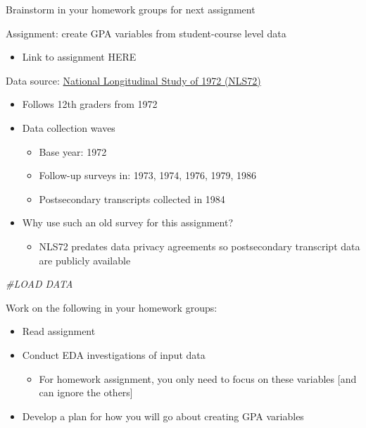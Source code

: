 \documentclass[8pt,ignorenonframetext,dvipsnames]{beamer}
\newenvironment{Shaded}{\begin{snugshade}}{\end{snugshade}}
\newcommand{\CommentTok}[1]{\textcolor[rgb]{0.56,0.35,0.01}{\textit{#1}}}
\providecommand{\tightlist}{%
  \setlength{\itemsep}{0pt}\setlength{\parskip}{0pt}}
\let\olditem\item
\renewcommand{\item}{%
  \olditem\vspace{4pt}
}
\begin{document}
\begin{frame}[fragile]{Brainstorm in your homework groups for next
assignment}

Assignment: create GPA variables from student-course level data

\begin{itemize}
\tightlist
\item
  Link to assignment HERE
\end{itemize}

Data source: \href{https://nces.ed.gov/surveys/nls72/}{National
Longitudinal Study of 1972 (NLS72)}

\begin{itemize}
\tightlist
\item
  Follows 12th graders from 1972
\item
  Data collection waves

  \begin{itemize}
  \tightlist
  \item
    Base year: 1972
  \item
    Follow-up surveys in: 1973, 1974, 1976, 1979, 1986
  \item
    Postsecondary transcripts collected in 1984
  \end{itemize}
\item
  Why use such an old survey for this assignment?

  \begin{itemize}
  \tightlist
  \item
    NLS72 predates data privacy agreements so postsecondary transcript
    data are publicly available
  \end{itemize}
\end{itemize}

\begin{Shaded}
\begin{Highlighting}[]
\CommentTok{#LOAD DATA}
\end{Highlighting}
\end{Shaded}

Work on the following in your homework groups:

\begin{itemize}
\tightlist
\item
  Read assignment
\item
  Conduct EDA investigations of input data

  \begin{itemize}
  \tightlist
  \item
    For homework assignment, you only need to focus on these variables
    {[}and can ignore the others{]}
  \end{itemize}
\item
  Develop a plan for how you will go about creating GPA variables
\end{itemize}

\end{frame}
\end{document}

